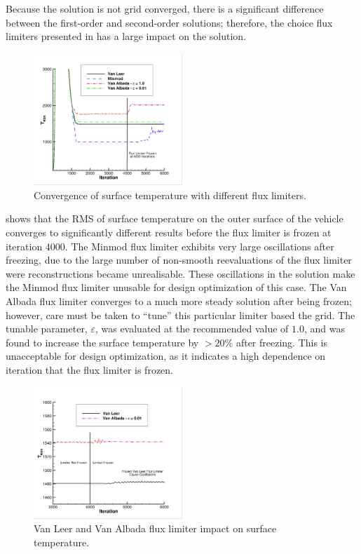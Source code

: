Because the solution is not grid converged, there is a significant difference
between the first-order and second-order solutions; therefore, the choice flux
limiters presented in  has a large impact on
the solution.  
\begin{figure}[h]
  \centering
  \includegraphics[width=0.5\textwidth]{figures/limiters/all-limiters.png}
  \caption{Convergence of surface temperature with different flux limiters.}
  \label{fig:all-limiters}
\end{figure}
 shows that the RMS of surface temperature on the outer
surface of the vehicle converges to significantly different results before
the flux limiter is frozen at iteration 4000.  The Minmod flux limiter exhibits
very large oscillations after freezing, due to the large number of non-smooth
reevaluations of the flux limiter were reconstructions became unrealisable.
These oscillations in the solution make the Minmod flux limiter unusable for
design optimization of this case. The Van Albada flux limiter converges to a
much more steady solution after being frozen; however, care must be taken to
``tune'' this particular limiter based the grid.  The tunable parameter,
$\varepsilon$, was evaluated at the recommended value of $1.0$, and was found to
increase the surface temperature by $> 20\%$ after freezing.  This is
unacceptable for design optimization, as it indicates a high dependence on
iteration that the flux limiter is frozen.
\begin{figure}[h]
  \centering
  \includegraphics[width=0.5\textwidth]{figures/limiters/vanleer-vanalbada-frozen.png}
  \caption{Van Leer and Van Albada flux limiter impact on surface temperature.}
  \label{fig:vl-va-impact}
\end{figure}
